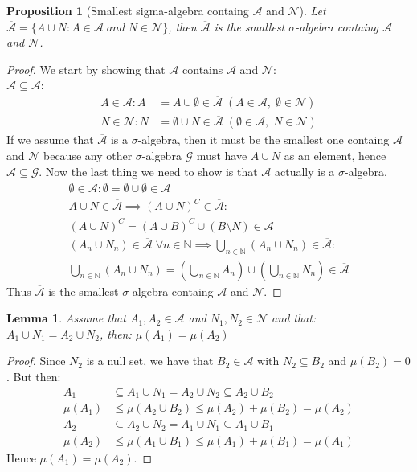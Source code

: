 \documentclass{article}
\newcommand{\N}{\mathbb{N}}
\newcommand{\A}{\mathcal{A}}
\newcommand{\G}{\mathcal{G}}
\newtheorem{prop}{Proposition}
\newtheorem{lemma}{Lemma}
\newtheorem{proof}{Proof}
\begin{document}
\begin{prop}[Smallest sigma-algebra containg $\A$ and $\mathcal{N}$]
Let \\
$\overline{\A} = \{A\cup N: A\in \A\; and\; N\in \mathcal{N}\}$, then $\overline{\A}$ is the smallest $\sigma$-algebra containg $\A$ and $\mathcal{N}$. 
\end{prop}

\begin{proof}
We start by showing that $\overline{\A}$ contains $\A$ and $\mathcal{N}$: \\
$\A \subseteq \overline{\A}$:
\begin{align*}
A\in \A: A &= A\cup \emptyset \in \overline{\A}\; (A\in \A, \; \emptyset \in \mathcal{N})\\ 
N\in \mathcal{N}: N &= \emptyset \cup N \in \overline{\A}\; (\emptyset \in \A, \; N \in \mathcal{N})
\end{align*}
If we assume that $\overline{\A}$ is a $\sigma$-algebra, then it must be the smallest one containg $\A$ and $\mathcal{N}$ because any other $\sigma$-algebra $\G$ must have $A\cup N$ as an element, hence $\overline{\A}\subseteq \G$.
Now the last thing we need to show is that $\overline{\A}$ actually is a $\sigma$-algebra. 
\begin{align*}
\emptyset \in \overline{\A}: \emptyset = \emptyset\cup \emptyset \in \overline{\A} \\ 
A\cup N \in \overline{\A} \implies (A\cup N)^{C} \in \overline{\A}:\\ 
(A\cup N)^{C} = (A\cup B)^{C}\cup (B\setminus N) \in \overline{\A}\\ 
(A_{n}\cup N_{n}) \in \overline{\A}\; \forall n\in \N \implies \bigcup_{n\in \N}\left(A_{n}\cup N_{n}\right) \in \overline{\A}: \\ 
\bigcup_{n\in \N}\left(A_{n}\cup N_{n}\right) = \left(\bigcup_{n\in \N}A_{n}\right)\cup \left(\bigcup_{n\in \N}N_{n}  \right) \in \overline{\A}
\end{align*}
Thus $\overline{\A}$ is the smallest $\sigma$-algebra containg $\A$ and $\mathcal{N}$. 
\end{proof}  

\begin{lemma}
Assume that $A_{1}, A_{2} \in \A$ and $N_{1}, N_{2} \in \mathcal{N}$ and that: 
$A_{1}\cup N_{1} = A_{2}\cup N_{2}$, then: $\mu(A_{1}) = \mu(A_{2})$
\end{lemma}

\begin{proof}
Since $N_{2}$ is a null set, we have that $B_{2}\in \A$ with $N_{2}\subseteq B_{2}$ and $\mu(B_{2}) = 0$. But then: 
\begin{align*}
A_{1} &\subseteq A_{1}\cup N_{1} = A_{2}\cup N_{2} \subseteq A_{2}\cup B_{2}\\ 
\mu(A_{1}) &\leq \mu(A_{2}\cup B_{2}) \leq \mu(A_{2}) + \mu(B_{2}) = \mu(A_{2})\\ 
A_{2} &\subseteq A_{2}\cup N_{2} = A_{1}\cup N_{1} \subseteq A_{1}\cup B_{1}\\ 
\mu(A_{2}) &\leq \mu(A_{1}\cup B_{1}) \leq \mu(A_{1}) + \mu(B_{1}) = \mu(A_{1})
\end{align*}
Hence $\mu(A_{1}) = \mu(A_{2})$. 
\end{proof}
\end{document}
